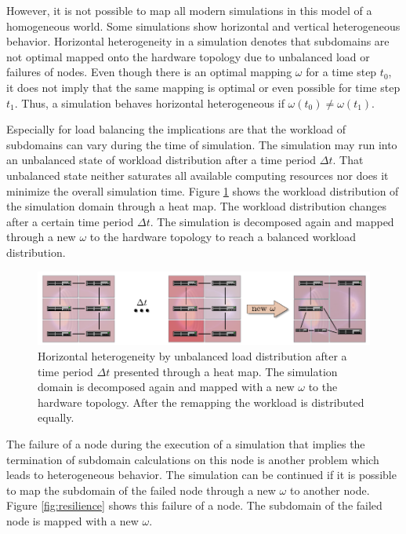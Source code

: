 However, it is not possible to map all modern simulations in this
model of a homogeneous world. Some simulations show horizontal and
vertical heterogeneous behavior. Horizontal heterogeneity in a
simulation denotes that subdomains are not optimal mapped onto the
hardware topology due to unbalanced load or failures of nodes.  Even
though there is an optimal mapping $\omega$ for a time step $t_0$, it
does not imply that the same mapping is optimal or even possible for
time step $t_1$.  Thus, a simulation behaves horizontal heterogeneous
if $\omega(t_0) \neq \omega(t_1)$.

Especially for load balancing the implications are that the workload of
subdomains can vary during the time of simulation. The simulation may
run into an unbalanced state of workload distribution after a time
period $\Delta t$. That unbalanced state neither saturates all
available computing resources nor does it minimize the overall
simulation time. Figure \ref{fig:load_balancing} shows the workload
distribution of the simulation domain through a heat map. The workload
distribution changes after a certain time period $\Delta t$. The
simulation is decomposed again and mapped through a new $\omega$ to
the hardware topology to reach a balanced workload distribution.

\begin{figure}[H]
  \centering \includegraphics[width=\textwidth]{graphics/30_load_balancing}
  \caption{Horizontal heterogeneity by unbalanced load distribution
    after a time period $\Delta t$ presented through a heat map.  The
    simulation domain is decomposed again and mapped with a new
    $\omega$ to the hardware topology. After the remapping the
    workload is distributed equally.}
  \label{fig:load_balancing}
\end{figure}

\noindent The failure of a node during the execution of a simulation
that implies the termination of subdomain calculations on this node is
another problem which leads to heterogeneous behavior. The simulation
can be continued if it is possible to map the subdomain of the failed
node through a new $\omega$ to another node. Figure
\ref{fig:resilience} shows this failure of a node. The subdomain of
the failed node is mapped with a new $\omega$.

